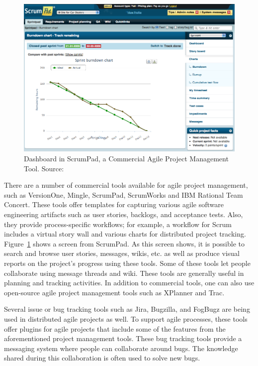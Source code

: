 \begin{figure}[!ht]
	\centering
	\includegraphics[width=\textwidth]{Scrumpad.png}
    \caption{Dashboard in ScrumPad, a Commercial Agile Project Management Tool. Source: \cite{scrum_pad}}
	\label{fig:scrumpad}
\end{figure}


There are a number of commercial tools available for agile project management, such as VersionOne\cite{version_one}, Mingle\cite{mingle}, ScrumPad\cite{scrum_pad}, ScrumWorks\cite{scrum_works} and IBM Rational Team Concert\cite{ibm_rtc}. These tools offer templates for capturing various agile software engineering artifacts such as user stories, backlogs, and acceptance tests. Also, they provide process-specific workflows; for example, a workflow for Scrum includes a virtual story wall and various charts for distributed project tracking. Figure~\ref{fig:scrumpad} shows a screen from ScrumPad. As this screen shows, it is possible to search and browse user stories, messages, wikis, etc. as well as produce visual reports on the project's progress using these tools. Some of these tools let people collaborate using message threads and wiki. These tools are generally useful in planning and tracking activities. In addition to commercial tools, one can also use open-source agile project management tools such as XPlanner\cite{xplanner} and Trac\cite{trac}.

Several issue or bug tracking tools such as Jira\cite{jira}, Bugzilla\cite{bugzilla}, and FogBugz\cite{fog_bugz} are being used in distributed agile projects as well. To support agile processes, these tools offer plugins for agile projects that include some of the features from the aforementioned project management tools. These bug tracking tools provide a messaging system where people can collaborate around bugs. The knowledge shared during this collaboration is often used to solve new bugs\cite{issue_tracking}.

